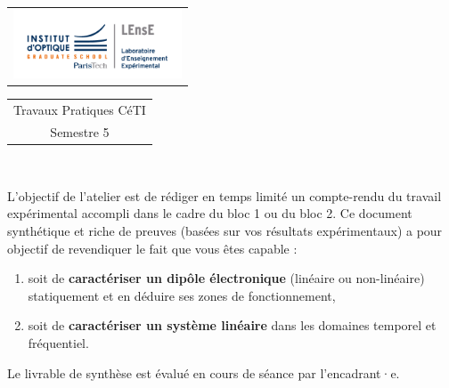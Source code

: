 \Large 
\begin{tabular}{c}
\includegraphics[width=5cm]{logoLEnsE.png}
\end{tabular}
\hfill
\begin{tabular}{c}
Travaux Pratiques CéTI \\
Semestre 5 \\
\end{tabular}\\
\normalsize 

\bigskip

\begin{mdframed}[style=aavbox,frametitle={Travail de synthèse}]

L'objectif de l'atelier est de rédiger en temps limité un compte-rendu du travail expérimental accompli dans le cadre du bloc 1 ou du bloc 2. Ce document synthétique et riche de preuves (basées sur vos résultats expérimentaux) a pour objectif de revendiquer le fait que vous êtes capable :

\begin{enumerate}
	\item soit de \textbf{caractériser un dipôle électronique} (linéaire ou non-linéaire) statiquement et en déduire ses zones de fonctionnement, 
	\item soit de \textbf{caractériser un système linéaire} dans les domaines temporel et fréquentiel.
\end{enumerate}

Le livrable de synthèse est évalué en cours de séance par l'encadrant·e. 
\end{mdframed}	

\medskip